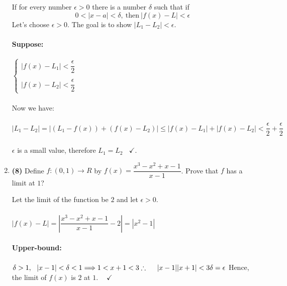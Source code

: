 \documentclass[fleqn]{article}
\begin{document}
\begin{enumerate}
      \textcolor{hwColor}{
        If for every number $\epsilon > 0$ there is a number $\delta$ such that if 
        $$
          0<|x-a|< \delta, ~ \textrm{then} ~ |f(x)-L| < \epsilon
        $$
        Let's choose $\epsilon > 0$. The goal is to show $|L_1-L_2|< \epsilon$. 
        \\
        \\
        \textbf{Suppose:}
        \\
        \\
        $
          \begin{cases}
            |f(x)-L_1| < \dfrac{\epsilon}{2}
            \\
            \\
            |f(x)-L_2| < \dfrac{\epsilon}{2}
          \end{cases}
        $
        \\
        \\
        Now we have:
        \\
        \\
        $
          |L_1-L_2|=|\left(L_1-f(x)\right)+\left(f(x)-L_2\right)| \leq |f(x)-L_1|+|f(x)-L_2| < \dfrac{\epsilon}{2}+\dfrac{\epsilon}{2}
        $
        \\
        \\
        $\epsilon$ is a small value, therefore $L_1=L_2 ~~~~ \checkmark$.
      }


    \item \textbf{(8)} Define $f: (0, 1) \longrightarrow R$ by $f(x)=\dfrac{x^3-x^2+x-1}{x-1}$. Prove that $f$ has a limit at $1$?

      \textcolor{hwColor}{
        Let the limit of the function be $2$ and let $\epsilon > 0$.
        \\
        \\
        $
          |f(x)-L|=|\dfrac{x^3-x^2+x-1}{x-1}-2|=|x^2-1|
        $
        \\
        \\
        \textbf{Upper-bound:}
        \\
        \\
        $
          \delta > 1, ~~ |x-1|<\delta<1 \Longrightarrow 1<x+1<3
          \\
          \\
          \\
          \therefore ~~~~ |x-1||x+1|<3 \delta=\epsilon
        $
        Hence, the limit of $f(x)$ is $2$ at $1$. $~~~~ \checkmark$
      }

  \end{enumerate}
\end{document}
